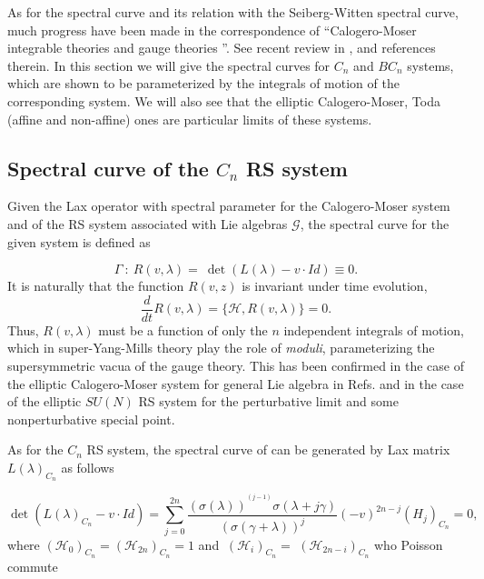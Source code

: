 \documentclass[a4paper,12pt]{article}
\begin{document}
As for the spectral curve and its relation with the
Seiberg-Witten spectral curve, much progress have been made
in the correspondence of ``Calogero-Moser integrable
theories and gauge theories ''. See recent review in
\cite{hp2}, \cite{Marbook} and references therein. In this
section we will give the spectral curves for $C_{n}$ and
$BC_{n}$ systems, which are shown to be parameterized by the
integrals of motion of the corresponding system. We will also
see that the elliptic Calogero-Moser, Toda (affine and
non-affine) ones are particular limits of these systems.

\subsection{Spectral curve of the $C_{n}$ RS system}

Given the Lax operator with spectral parameter for the
Calogero-Moser system and of the RS system associated with
Lie algebras $\mathcal{G}$, the spectral curve for the given
system is defined as

\begin{equation}
\Gamma \ :\ R(v,\lambda )=~\det (L(\lambda )-v\cdot Id)\equiv 0.
\end{equation}
It is naturally that the function $R(v,z)$ is invariant
under time evolution,
\begin{equation}
{\frac{d}{dt}}R(v,\lambda )=\{\mathcal{H},R(v,\lambda )\}=0.
\end{equation}
Thus, $R(v,\lambda )$ must be a function of only the $n$
independent integrals of motion, which in super-Yang-Mills
theory play the role of
\textit{moduli}, parameterizing the supersymmetric vacua of the gauge theory.
This has been confirmed in the case of the elliptic
Calogero-Moser system for general Lie algebra
in Refs. \cite{hp3,hp4} and in the case of the elliptic $SU(N)$
RS system for the perturbative limit and some
nonperturbative special point\cite{bm1}.

As for the $C_{n}$ RS system, the spectral curve of can be
generated by Lax matrix $L(\lambda)_{C_{n}}$ as follows

\begin{equation}
\det (L(\lambda )_{C_{n}}-v\cdot Id)=\sum_{j=0}^{2n}\frac{(\sigma (\lambda
))^{^{(j-1)}}\sigma (\lambda +j\gamma )}{(\sigma (\gamma
+\lambda ))^{j}} (-v)^{2n-j}(H_{j})_{C_{n}}=0,
\end{equation}
where
$(\mathcal{H}_{0})_{C_{n}}=(\mathcal{H}_{2n})_{C_{n}}=1$ and
$\ (
\mathcal{H}_{i})_{C_{n}}=$ $(\mathcal{H}_{2n-i})_{C_{n}}$ who Poisson commute
\end{document}
